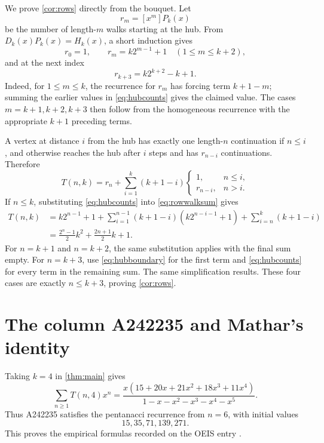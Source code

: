 \documentclass[11pt]{article}
\theoremstyle{remark}
\begin{document}
We prove \cref{cor:rows} directly from the bouquet.  Let
\[
 r_m=[x^m]P_k(x)
\]
be the number of length-$m$ walks starting at the hub.  From
$D_k(x)P_k(x)=H_k(x)$, a short induction gives
\begin{equation}\label{eq:hubcounts}
 r_0=1,
 \qquad
 r_m=k2^{m-1}+1\quad(1\leq m\leq k+2),
\end{equation}
and at the next index
\begin{equation}\label{eq:hubboundary}
 r_{k+3}=k2^{k+2}-k+1.
\end{equation}
Indeed, for $1\leq m\leq k$, the recurrence for $r_m$ has forcing term
$k+1-m$; summing the earlier values in \eqref{eq:hubcounts} gives the claimed
value.  The cases $m=k+1,k+2,k+3$ then follow from the homogeneous recurrence
with the appropriate $k+1$ preceding terms.

A vertex at distance $i$ from the hub has exactly one length-$n$ continuation
if $n\leq i$, and otherwise reaches the hub after $i$ steps and has
$r_{n-i}$ continuations.  Therefore
\begin{equation}\label{eq:rowwalksum}
 T(n,k)=r_n+\sum_{i=1}^{k}(k+1-i)
 \begin{cases}
  1,& n\leq i,\\
  r_{n-i},& n>i.
 \end{cases}
\end{equation}
If $n\leq k$, substituting \eqref{eq:hubcounts} into
\eqref{eq:rowwalksum} gives
\begin{align*}
 T(n,k)
 &=k2^{n-1}+1
   +\sum_{i=1}^{n-1}(k+1-i)(k2^{n-i-1}+1)
   +\sum_{i=n}^{k}(k+1-i)\\
 &=\frac{2^n-1}{2}k^2+\frac{2n+1}{2}k+1.
\end{align*}
For $n=k+1$ and $n=k+2$, the same substitution applies with the final sum
empty.  For $n=k+3$, use \eqref{eq:hubboundary} for the first term and
\eqref{eq:hubcounts} for every term in the remaining sum.  The same
simplification results.  These four cases are exactly $n\leq k+3$, proving
\cref{cor:rows}.

\section{The column A242235 and Mathar's identity}

Taking $k=4$ in \cref{thm:main} gives
\begin{equation}\label{eq:A242235GF}
 \sum_{n\geq1}T(n,4)x^n
 =\frac{x(15+20x+21x^2+18x^3+11x^4)}
 {1-x-x^2-x^3-x^4-x^5}.
\end{equation}
Thus A242235 satisfies the pentanacci recurrence from $n=6$, with initial
values
\[
 15,35,71,139,271.
\]
This proves the empirical formulas recorded on the OEIS entry
\cite{oeisA242235}.
\end{document}
